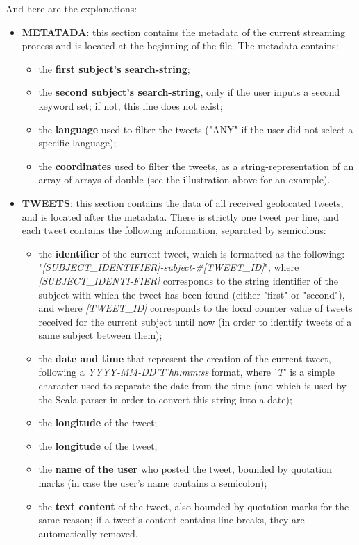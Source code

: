 \documentclass[a4paper,11pt]{report}
\begin{document}
And here are the explanations:
\begin{itemize}
	\item \textbf{METATADA}: this section contains the metadata of the current streaming process and is located at the beginning of the file. The metadata contains:
	\begin{itemize}
		\item the \textbf{first subject's search-string};
		\item the \textbf{second subject's search-string}, only if the user inputs a second keyword set; if not, this line does not exist;
		\item the \textbf{language} used to filter the tweets ("ANY" if the user did not select a specific language);
		\item the \textbf{coordinates} used to filter the tweets, as a string-representation of an array of arrays of double (see the illustration above for an example).
	\end{itemize}

	\item \textbf{TWEETS}: this section contains the data of all received geolocated tweets, and is located after the metadata. There is strictly one tweet per line, and each tweet contains the following information, separated by semicolons:
	\begin{itemize}
		\item the \textbf{identifier} of the current tweet, which is formatted as the following: \\"\emph{[SUBJECT\_IDENTIFIER]-subject-\#[TWEET\_ID]}", where \emph{[SUBJECT\_IDENTI-FIER]} corresponds to the string identifier of the subject with which the tweet has been found (either "first" or "second"), and where \emph{[TWEET\_ID]} corresponds to the local counter value of tweets received for the current subject until now (in order to identify tweets of a same subject between them);
		\item the \textbf{date and time} that represent the creation of the current tweet, following a \emph{YYYY-MM-DD'T'hh:mm:ss} format, where '\emph{T}' is a simple character used to separate the date from the time (and which is used by the Scala parser in order to convert this string into a date);
		\item the \textbf{longitude} of the tweet;
		\item the \textbf{longitude} of the tweet;
		\item the \textbf{name of the user} who posted the tweet, bounded by quotation marks (in case the user's name contains a semicolon);
		\item the \textbf{text content} of the tweet, also bounded by quotation marks for the same reason; if a tweet's content contains line breaks, they are automatically removed.
	\end{itemize}


\end{itemize}
\end{document}
